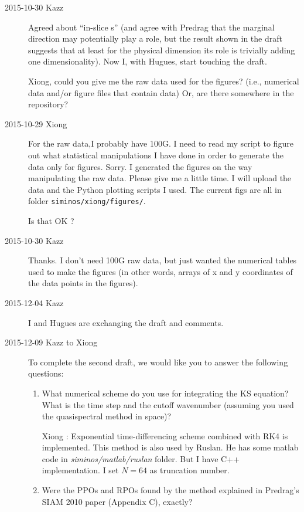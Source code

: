 \begin{description}
\item[2015-10-30 Kazz]
Agreed about ``in-slice \Fv s'' (and agree with Predrag that the marginal
direction may potentially play a role, but the result shown in the draft
suggests that at least for the physical dimension its role is trivially
adding one dimensionality). Now I, with Hugues, start touching the draft.

Xiong, could you give me the raw data used for the figures? (i.e.,
numerical data and/or figure files that contain data) Or, are there
somewhere in the repository?

\item[2015-10-29 Xiong]
For the raw data,I probably have 100G. I need to read my script to
figure out what
statistical manipulations I have done in order to generate the data
only for figures. Sorry. I generated the figures on the way manipulating
the raw data. Please give me a little time. I will upload the data and the
Python plotting scripts I used.
The current figs are all in folder \texttt{siminos/xiong/figures/}.

Is that OK ?

\item[2015-10-30 Kazz]
Thanks. I don't need 100G raw data, but just wanted the numerical tables
used to make the figures (in other words, arrays of x and y coordinates
of the data points in the figures).

\item[2015-12-04 Kazz]
I and Hugues are exchanging the draft and comments.

\item[2015-12-09 Kazz to Xiong]
To complete the second draft,
 we would like you to answer the following questions:

\begin{enumerate}
\item
What numerical scheme do you use for integrating the KS equation? What is the time step and the cutoff wavenumber (assuming you used the quasispectral method in space)?

Xiong : Exponential time-differencing
scheme combined with RK4 is implemented. This
method is also used by Ruslan. He has some matlab code in
\emph{siminos/matlab/ruslan} folder. But I have C++ implementation.
I set $N=64$ as truncation number.

\item
Were the PPOs and RPOs found by the method explained in Predrag's SIAM 2010 paper (Appendix C), exactly?


\end{enumerate}
\end{description}
